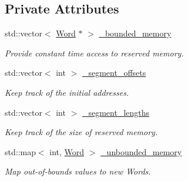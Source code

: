 \subsection*{Private Attributes}
\begin{DoxyCompactItemize}
\item 
\hypertarget{classMemory_a261c779e202d16009dd48c68291266f9}{
std::vector$<$ \hyperlink{classWord}{Word} $\ast$ $>$ \hyperlink{classMemory_a261c779e202d16009dd48c68291266f9}{\_\-bounded\_\-memory}}
\label{classMemory_a261c779e202d16009dd48c68291266f9}

\begin{DoxyCompactList}\small\item\em Provide constant time access to reserved memory. \item\end{DoxyCompactList}\item 
\hypertarget{classMemory_adceb29287c4850dc78b4a66cc0890d47}{
std::vector$<$ int $>$ \hyperlink{classMemory_adceb29287c4850dc78b4a66cc0890d47}{\_\-segment\_\-offsets}}
\label{classMemory_adceb29287c4850dc78b4a66cc0890d47}

\begin{DoxyCompactList}\small\item\em Keep track of the initial addresses. \item\end{DoxyCompactList}\item 
\hypertarget{classMemory_a8a5f79ee8ee270287a668383ec8f4a6d}{
std::vector$<$ int $>$ \hyperlink{classMemory_a8a5f79ee8ee270287a668383ec8f4a6d}{\_\-segment\_\-lengths}}
\label{classMemory_a8a5f79ee8ee270287a668383ec8f4a6d}

\begin{DoxyCompactList}\small\item\em Keep track of the size of reserved memory. \item\end{DoxyCompactList}\item 
\hypertarget{classMemory_a390295664efe18aa33298ead1004c442}{
std::map$<$ int, \hyperlink{classWord}{Word} $>$ \hyperlink{classMemory_a390295664efe18aa33298ead1004c442}{\_\-unbounded\_\-memory}}
\label{classMemory_a390295664efe18aa33298ead1004c442}

\begin{DoxyCompactList}\small\item\em Map out-\/of-\/bounds values to new Words. \item\end{DoxyCompactList}\end{DoxyCompactItemize}


